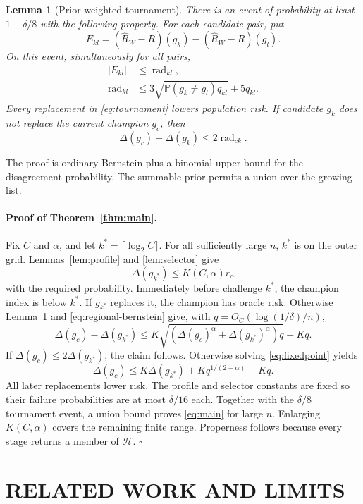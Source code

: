 \documentclass[twoside]{article}
\newtheorem{lemma}[theorem]{Lemma}
\newcommand{\Hc}{\mathcal H}
\newcommand{\Pp}{\mathbb P}
\newcommand{\Ex}{\Delta}
\begin{document}
\begin{lemma}[Prior-weighted tournament]
\label{lem:tournament}
There is an event of probability at least $1-\delta/8$ with the following property. For each candidate pair, put \[ E_{kl}=(\widehat R_W-R)(g_k) -(\widehat R_W-R)(g_l). \] On this event, simultaneously for all pairs,
\begin{align}
 |E_{kl}|&\leq\operatorname{rad}_{kl},\nonumber\\
 \operatorname{rad}_{kl}
 &\leq3\sqrt{\Pp(g_k\ne g_l)q_{kl}}
 +5q_{kl}.
 \label{eq:empbern}
\end{align}
Every replacement in \eqref{eq:tournament} lowers population risk. If candidate $g_k$ does not replace the current champion $g_c$, then \[ \Ex(g_c)-\Ex(g_k)\leq2\operatorname{rad}_{ck}. \]
\end{lemma}

The proof is ordinary Bernstein plus a binomial upper bound for the disagreement probability. The summable prior permits a union over the growing list.

\paragraph{Proof of Theorem~\ref{thm:main}.}
Fix $C$ and $\alpha$, and let $k^*=\lceil\log_2C\rceil$. For all sufficiently large $n$, $k^*$ is on the outer grid. Lemmas~\ref{lem:profile} and \ref{lem:selector} give \[ \Ex(g_{k^*})\leq K(C,\alpha)r_\alpha \] with the required probability. Immediately before challenge $k^*$, the champion index is below $k^*$. If $g_{k^*}$ replaces it, the champion has oracle risk. Otherwise Lemma~\ref{lem:tournament} and \eqref{eq:regional-bernstein} give, with $q=O_C(\log(1/\delta)/n)$,
\begin{equation}
 \Ex(g_c)-\Ex(g_{k^*})
 \leq K\sqrt{(\Ex(g_c)^\alpha+\Ex(g_{k^*})^\alpha)q}+Kq.
 \label{eq:fixedpoint}
\end{equation}
If $\Ex(g_c)\leq2\Ex(g_{k^*})$, the claim follows. Otherwise solving \eqref{eq:fixedpoint} yields \[ \Ex(g_c)\leq K\Ex(g_{k^*})+Kq^{1/(2-\alpha)}+Kq. \] All later replacements lower risk. The profile and selector constants are fixed so their failure probabilities are at most $\delta/16$ each. Together with the $\delta/8$ tournament event, a union bound proves \eqref{eq:main} for large $n$. Enlarging $K(C,\alpha)$ covers the remaining finite range. Properness follows because every stage returns a member of $\Hc$. \hfill$\square$

\section{RELATED WORK AND LIMITS}
\end{document}
